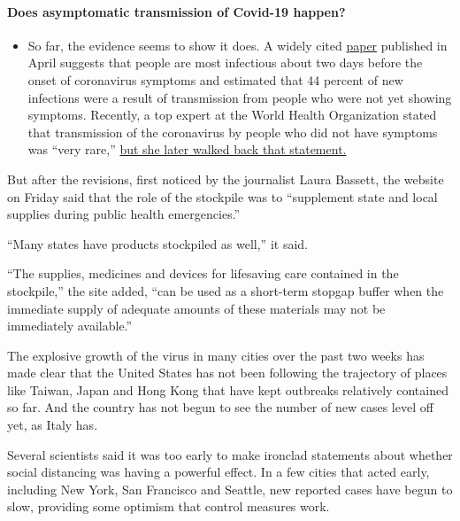 \begin{itemize}
{  \paragraph{Does asymptomatic transmission of Covid-19
  happen?}\label{does-asymptomatic-transmission-of-covid-19-happen}}

  \begin{itemize}
  \tightlist
  \item
    So far, the evidence seems to show it does. A widely cited
    \href{https://www.nature.com/articles/s41591-020-0869-5}{paper}
    published in April suggests that people are most infectious about
    two days before the onset of coronavirus symptoms and estimated that
    44 percent of new infections were a result of transmission from
    people who were not yet showing symptoms. Recently, a top expert at
    the World Health Organization stated that transmission of the
    coronavirus by people who did not have symptoms was ``very rare,''
    \href{https://www.nytimes.com/2020/06/09/world/coronavirus-updates.html?action=click\&pgtype=Article\&state=default\&region=MAIN_CONTENT_3\&context=storylines_faq\#link-1f302e21}{but
    she later walked back that statement.}
  \end{itemize}
\end{itemize}

But after the revisions, first noticed by the journalist Laura Bassett,
the website on Friday said that the role of the stockpile was to
``supplement state and local supplies during public health
emergencies.''

``Many states have products stockpiled as well,'' it said.

``The supplies, medicines and devices for lifesaving care contained in
the stockpile,'' the site added, ``can be used as a short-term stopgap
buffer when the immediate supply of adequate amounts of these materials
may not be immediately available.''

The explosive growth of the virus in many cities over the past two weeks
has made clear that the United States has not been following the
trajectory of places like Taiwan, Japan and Hong Kong that have kept
outbreaks relatively contained so far. And the country has not begun to
see the number of new cases level off yet, as Italy has.

Several scientists said it was too early to make ironclad statements
about whether social distancing was having a powerful effect. In a few
cities that acted early, including New York, San Francisco and Seattle,
new reported cases have begun to slow, providing some optimism that
control measures work.


